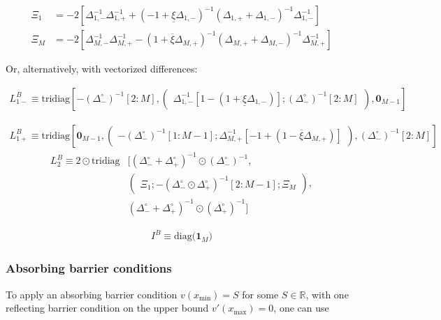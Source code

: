 \documentclass[11pt]{article}
\theoremstyle{definition}
\begin{document}
\begin{align}
\Xi_{1} &= -2\left[  \Delta_{1,-}^{-1} \Delta_{1,+}^{-1} + (-1 + \underline{\xi} \Delta_{1,-})^{-1} (\Delta_{1,+} + \Delta_{1,-})^{-1}  \Delta_{1,-}^{-1} \right] \\
\Xi_{M} &= -2\left[  \Delta_{M,-}^{-1} \Delta_{M,+}^{-1} - (1 + \overline{\xi} \Delta_{M,+})^{-1} (\Delta_{M,+} + \Delta_{M,-})^{-1}  \Delta_{M,+}^{-1} \right]
\end{align}


Or, alternatively, with vectorized differences:


\begin{align}
{L}_{1-}^B \equiv
\text{tridiag} \left[-(\Delta_-^\circ)^{-1}[2:M], \begin{pmatrix}\Delta^{-1}_{1,-} [1 - (1 + \underline{\xi} \Delta_{1,-})]; (\Delta_-^\circ )^{-1}[2:M] \end{pmatrix}, \mathbf{0}_{M-1}  \right]
\end{align}

\begin{align}
{L}_{1+}^B \equiv
\text{tridiag} \left[  \mathbf{0}_{M-1},
\begin{pmatrix}-(\Delta_-^\circ )^{-1}[1:M-1]; \Delta^{-1}_{M,+} [-1 + (1 - \overline{\xi} \Delta_{M,+})] \end{pmatrix},
(\Delta_-^\circ)^{-1}[2:M]
 \right]
\end{align}
\begin{align}
{L}_{2}^B \equiv
2 \odot \text{tridiag}& \Big[(\Delta_-^\circ + \Delta_+^\circ)^{-1} \odot (\Delta_{-}^\circ)^{-1}, \\&
	\begin{pmatrix}
	\Xi_1 ;
	-(\Delta_-^\circ \odot \Delta_+^\circ)^{-1}[2:M-1];
	\Xi_M
	\end{pmatrix} , \\&
	(\Delta_-^\circ + \Delta_+^\circ)^{-1} \odot (\Delta_{+}^\circ)^{-1} \Big]
\end{align}

\begin{align}
I^B \equiv  \text{diag($\mathbf{1}_M$)}
\end{align}


\subsubsection{Absorbing barrier conditions}

To apply an absorbing barrier condition $v(x_{\min}) =S$ for some $S \in \mathbb{R}$, with one reflecting barrier condition on the upper bound $v'(x_{\max}) = 0$, one can use
\end{document}
